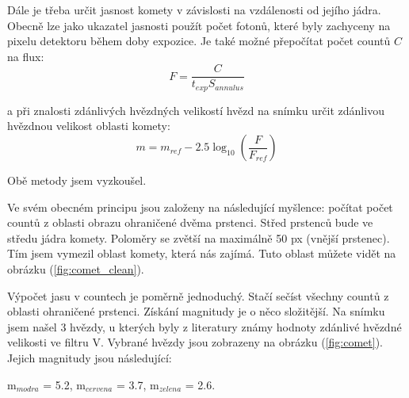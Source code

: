 \documentclass[a4paper,11pt]{article}
\begin{document}
    \begin{minipage}[t]{0.5\textwidth} 
            Dále je třeba určit jasnost komety v závislosti na vzdálenosti od jejího jádra. Obecně lze jako ukazatel jasnosti použít počet fotonů, které byly zachyceny na pixelu detektoru během doby expozice. Je také možné přepočítat počet countů $C$ na flux:
            \begin{equation}
                F = \frac{C}{t_{exp} S_{annulus}}
            \end{equation}
            \par a při znalosti zdánlivých hvězdných velikostí hvězd na snímku určit zdánlivou hvězdnou velikost oblasti komety:
            \begin{equation}
                m = m_{ref} - 2.5 \log_{10} \left( \frac{F}{F_{ref}} \right)
            \end{equation}
            \par Obě metody jsem vyzkoušel. 
            \par Ve svém obecném principu jsou založeny na následující myšlence: počítat počet countů z oblasti obrazu ohraničené dvěma prstenci. Střed prstenců bude ve středu jádra komety. Poloměry se zvětší na maximálně 50 px (vnější prstenec). Tím jsem vymezil oblast komety, která nás zajímá. Tuto oblast můžete vidět na obrázku (\ref{fig:comet_clean}).
            \par Výpočet jasu v countech je poměrně jednoduchý. Stačí sečíst všechny countů z oblasti ohraničené prstenci. Získání magnitudy je o něco složitější. Na snímku jsem našel 3 hvězdy, u kterých byly z literatury známy hodnoty zdánlivé hvězdné velikosti ve filtru V. Vybrané hvězdy jsou zobrazeny na obrázku (\ref{fig:comet}). Jejich magnitudy jsou následující: 
            \begin{center}
                m$_{modra}$ = 5.2, m$_{cervena}$ = 3.7, m$_{zelena}$ = 2.6.
            \end{center}
    \end{minipage}
    \hspace{10pt}
\end{document}
